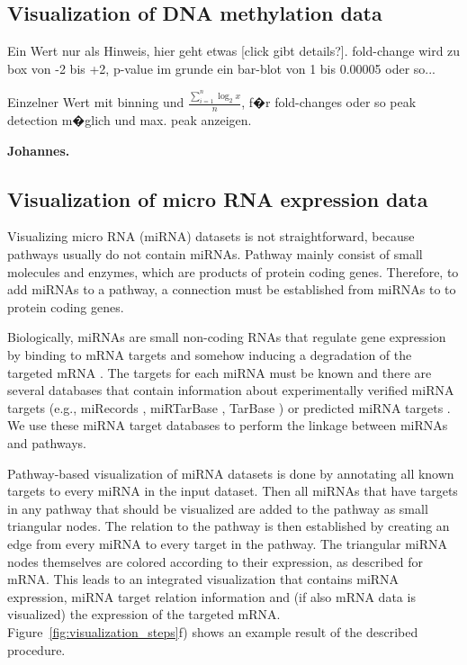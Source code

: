 \documentclass{bioinfo}
\begin{document}
\subsection{Visualization of DNA methylation data}

Ein Wert nur als Hinweis, hier geht etwas [click gibt details?]. fold-change wird zu box von -2 bis
+2, p-value im grunde ein bar-blot von 1 bis 0.00005 oder so...

Einzelner Wert mit binning und $\frac{\sum\limits_{i=1}^n\log_2 x}{n}$, f�r fold-changes oder so
peak detection m�glich und max. peak anzeigen.

\textbf{Johannes.}


\subsection{Visualization of micro RNA expression data}

Visualizing micro RNA (miRNA) datasets is not straightforward, because pathways usually do not
contain miRNAs. Pathway mainly consist of small molecules and enzymes, which are products of protein
coding genes. Therefore, to add miRNAs to a pathway, a connection must be established from miRNAs to
to protein coding genes.

Biologically, miRNAs are small non-coding RNAs that regulate gene expression by binding to mRNA
targets and somehow inducing a degradation of the targeted mRNA \citep{Bartel2004}. The targets for
each miRNA must be known and there are several databases that contain information about
experimentally verified miRNA targets (e.g., miRecords \citep[see][]{miRecords}, miRTarBase
\citep[see][]{miRTarBase}, TarBase \citep[see][]{TarBase}) or predicted miRNA targets
\citep{Alexiou2009}. We use these miRNA target databases to perform the linkage between miRNAs and
pathways.

Pathway-based visualization of miRNA datasets is done by annotating all known targets to every miRNA
in the input dataset. Then all miRNAs that have targets in any pathway that should be visualized are
added to the pathway as small triangular nodes. The relation to the pathway is then established by
creating an edge from every miRNA to every target in the pathway. The triangular miRNA nodes
themselves are colored according to their expression, as described for mRNA.  This leads to an
integrated visualization that contains miRNA expression, miRNA target relation information and (if
also mRNA data is visualized) the expression of the targeted
mRNA. Figure~\ref{fig:visualization_steps}f) shows an example result of the described procedure.
\end{document}
